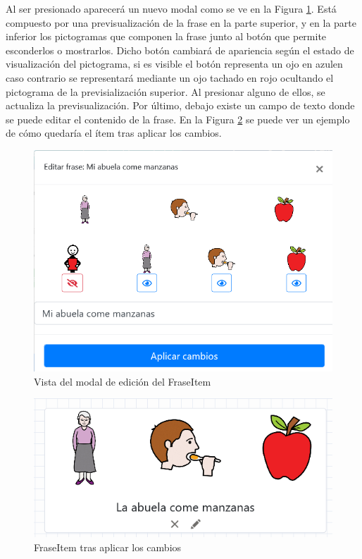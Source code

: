 Al ser presionado aparecerá un nuevo modal como se ve en la Figura \ref{fig:modaleditarfraseitem}. Está compuesto por una previsualización de la frase en la parte superior, y en la parte inferior los pictogramas que componen la frase junto al botón que permite esconderlos o mostrarlos. Dicho botón cambiará de apariencia según el estado de visualización del pictograma, si es visible el botón representa un ojo en azulen caso contrario se representará mediante un ojo tachado en rojo ocultando el pictograma de la previsialización superior. Al presionar alguno de ellos, se actualiza la previsualización. Por último, debajo existe un campo de texto donde se puede editar el contenido de la frase.
En la Figura \ref{fig:fraseitemmidificada} se puede ver un ejemplo de cómo quedaría el ítem tras aplicar los cambios. 

\begin{figure}[h!]
	\centering
	\includegraphics[width=0.7\linewidth]{Imagenes/Bitmap/modalEditarFraseItem}
	\caption{Vista del modal de edición del FraseItem}
	\label{fig:modaleditarfraseitem}
\end{figure}

\begin{figure}[h!]
	\centering
	\includegraphics[width=0.7\linewidth]{Imagenes/Bitmap/fraseItemMidificada}
	\caption{FraseItem tras  aplicar los cambios}
	\label{fig:fraseitemmidificada}
\end{figure}

